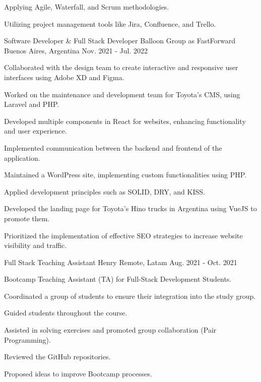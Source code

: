 \begin{cventries}
{\begin{cvitems}
        \item {Applying Agile, Waterfall, and Scrum methodologies.}
        \item {Utilizing project management tools like Jira, Confluence, and Trello.}
      \end{cvitems}
    }
  \vspace{5.5mm}
  \cventry
    {Software Developer \& Full Stack Developer} %
    {Balloon Group as FastForward} %
    {Buenos Aires, Argentina} %
    {Nov. 2021 - Jul. 2022} %
    {
      \begin{cvitems} %
        \item {Collaborated with the design team to create interactive and responsive user interfaces using Adobe XD and Figma.}
        \item {Worked on the maintenance and development team for Toyota's CMS, using Laravel and PHP.}
        \item {Developed multiple components in React for websites, enhancing functionality and user experience.}
        \item {Implemented communication between the backend and frontend of the application.}
        \item {Maintained a WordPress site, implementing custom functionalities using PHP.}
        \item {Applied development principles such as SOLID, DRY, and KISS.}
        \item {Developed the landing page for Toyota's Hino trucks in Argentina using VueJS to promote them.}
        \item {Prioritized the implementation of effective SEO strategies to increase website visibility and traffic.}
      \end{cvitems}
    }
  \vspace{5.5mm}
  \cventry
    {Full Stack Teaching Assistant} %
    {Henry} %
    {Remote, Latam} %
    {Aug. 2021 - Oct. 2021} %
    {
      \begin{cvitems} %
        \item {Bootcamp Teaching Assistant (TA) for Full-Stack Development Students.}
        \item {Coordinated a group of students to ensure their integration into the study group.}
        \item {Guided students throughout the course.}
        \item {Assisted in solving exercises and promoted group collaboration (Pair Programming).}
        \item {Reviewed the GitHub repositories.}
        \item {Proposed ideas to improve Bootcamp processes.}
      \end{cvitems}
    }

\end{cventries}
